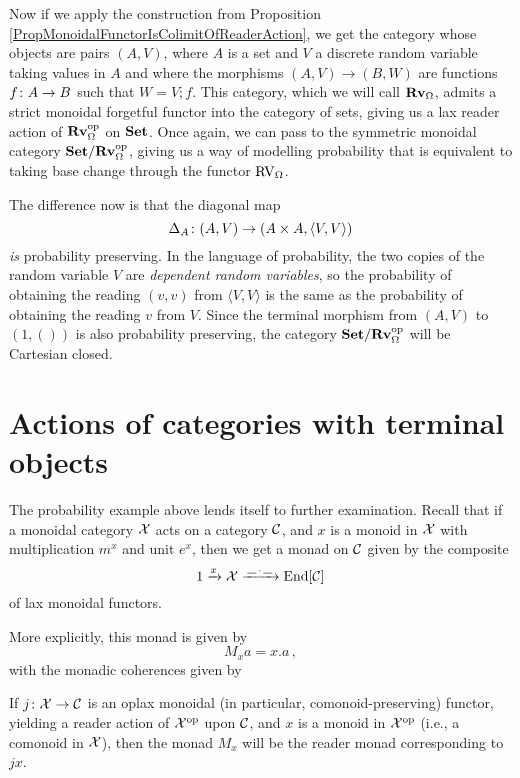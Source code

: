 \begin{example}
  Now if we apply the construction from Proposition \ref{PropMonoidalFunctorIsColimitOfReaderAction}, we get the category whose objects are pairs $(A,V)$, where $A$ is a set and $V$ a discrete random variable taking values in $A$ and where the morphisms $(A,V) \to (B,W)$ are functions $f \colon A \to B$ such that $W=V;f$.
  This category, which we will call ${\normalfont\textbf{Rv}}_\Omega$, admits a strict monoidal forgetful functor into the category of sets, giving us a lax reader action of ${\normalfont\textbf{Rv}}_\Omega^{\mathrm{op}}$ on ${\normalfont\textbf{Set}}$.
  Once again, we can pass to the symmetric monoidal category ${\normalfont\textbf{Set}}/{\normalfont\textbf{Rv}}_\Omega^{\mathrm{op}}$, giving us a way of modelling probability that is equivalent to taking base change through the functor $\operatorname{RV}_\Omega$.

  The difference now is that the diagonal map
  \[
    \Delta_A \colon (A,V) \to (A\times A, \langle V,V\rangle)
    \]
  \emph{is} probability preserving.  
  In the language of probability, the two copies of the random variable $V$ are \emph{dependent random variables}, so the probability of obtaining the reading $(v,v)$ from $\langle V,V\rangle$ is the same as the probability of obtaining the reading $v$ from $V$.
  Since the terminal morphism from $(A,V)$ to $(1,())$ is also probability preserving, the category ${\normalfont\textbf{Set}}/{\normalfont\textbf{Rv}}_\Omega^{\mathrm{op}}$ will be Cartesian closed.
  \label{ExRandomVariables}
\end{example}

\section{Actions of categories with terminal objects}
\label{SecActionsOfCategoriesWithTerminalObjects}

The probability example above lends itself to further examination.  
Recall that if a monoidal category $\mathcal X$ acts on a category ${\mathcal{C}}$, and $x$ is a monoid in $\mathcal X$ with multiplication $m^x$ and unit $e^x$, then we get a monad on ${\mathcal{C}}$ given by the composite
\[
  1 \xrightarrow{x} \mathcal X \xrightarrow{\,\underline{\hspace{1.5ex}}\,.\,\underline{\hspace{1.5ex}}\,} \operatorname{End}[{\mathcal{C}}]
  \]
of lax monoidal functors.

More explicitly, this monad is given by
\[
  M_xa = x.a\,,
  \]
with the monadic coherences given by
If $j\colon \mathcal X \to {\mathcal{C}}$ is an oplax monoidal (in particular, comonoid-preserving) functor, yielding a reader action of $\mathcal X^{\mathrm{op}}$ upon ${\mathcal{C}}$, and $x$ is a monoid in $\mathcal X^{\mathrm{op}}$ (i.e., a comonoid in $\mathcal X$), then the monad $M_x$ will be the reader monad corresponding to $jx$.


